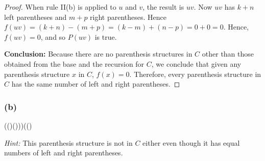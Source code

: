 \documentclass[14pt]{extarticle}
\begin{document}
\begin{proof}
    When rule II(b) is applied to $u$ and $v$, the result is $uv$. Now $uv$ has \(k + n\) left parentheses and \(m + p\)
    right parentheses. Hence \(f(uv) = (k + n) - (m + p) = (k - m) + (n - p) = 0 + 0 = 0\). Hence, \(f(uv) = 0\), and so $P(uv)$ is true.

        {\bf Conclusion:} Because there are no parenthesis structures in $C$ other than those obtained from the base
    and the recursion for $C$, we conclude that given any parenthesis structure $x$ in $C$, \(f(x) = 0\). Therefore,
    every parenthesis structure in $C$ has the same number of left and right parentheses.
\end{proof}

\subsubsection{(b)}
(()()))(()

{\it Hint:} This parenthesis structure is not in $C$ either even though it has equal numbers of left and right parentheses.
\end{document}
